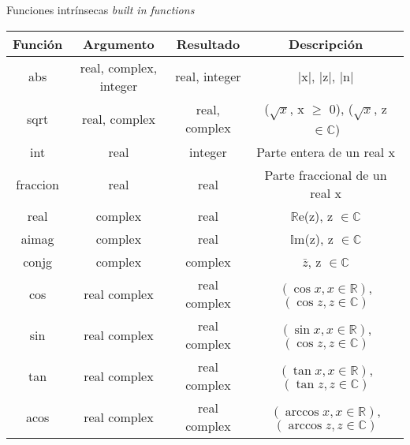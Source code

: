 \begin{frame}[fragile]{Funciones intrínsecas \textit{built in functions}}  
    \begin{table}[]
    \centering
    \label{Tabla_funcionesintr}
    \resizebox{10.5cm}{!} {
    \begin{tabular}{|c|c|c|c|}
    \hline
    Función         & Argumento                     & Resultado         & Descripción                                                       \\ \hline
    abs             & real, complex, integer        & real, integer     & |x|, |z|, |n|                                                     \\ \hline
    sqrt            & real, complex                 & real, complex     & ($\sqrt{x}$, x $\geq$ 0), ($\sqrt{x}$, z $\in \mathbb{C}$)        \\ \hline
    int             & real                          & integer           & Parte entera de un real x                                         \\ \hline
    fraccion        & real                          & real              & Parte fraccional de un real x                                     \\ \hline
    real            & complex                       & real              & $\mathbb{R}$e(z), z $\in \mathbb{C}$                              \\ \hline
    aimag           & complex                       & real              & $\mathbb{I}$m(z), z $\in \mathbb{C}$                              \\ \hline              
    conjg           & complex                       & complex           & $\bar{z}$, z $\in \mathbb{C}$                                     \\ \hline 
    cos             & real complex                  & real complex      & $(\cos x, x \in \mathbb{R})$, $(\cos z, z \in \mathbb{C})$        \\ \hline 
    sin             & real complex                  & real complex      & $(\sin x, x \in \mathbb{R})$, $(\cos z, z \in \mathbb{C})$        \\ \hline 
    tan             & real complex                  & real complex      & $(\tan x, x \in \mathbb{R})$, $(\tan z, z \in \mathbb{C})$        \\ \hline 
    acos            & real complex                  & real complex      & $(\arccos x, x \in \mathbb{R})$, $(\arccos z, z \in \mathbb{C})$  \\ \hline 

\end{tabular}}
\end{table}
\end{frame}
